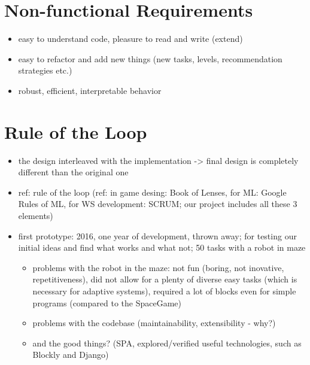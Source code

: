 \section{Non-functional Requirements}
\label{sec:robomission.nonfunctional-requirements}

\begin{itemize}
\item easy to understand code, pleasure to read and write (extend)
\item easy to refactor and add new things (new tasks, levels, recommendation strategies etc.)
\item robust, efficient, interpretable behavior
\end{itemize}



\section{Rule of the Loop}
\label{sec:robomission.rule-of-the-loop}

\begin{itemize}
\item the design interleaved with the implementation -> final design is completely different than the original one
\item ref: rule of the loop (ref: in game desing: Book of Lenses, for ML: Google Rules of ML, for WS development: SCRUM; our project includes all these 3 elements)
\item first prototype: 2016, one year of development, thrown away; for testing our initial ideas and find what works and what not; 50 tasks with a robot in maze
  \begin{itemize}
  \item problems with the robot in the maze: not fun (boring, not inovative, repetitiveness), did not allow for a plenty of diverse easy tasks (which is necessary for adaptive systems), required a lot of blocks even for simple programs (compared to the SpaceGame)
  \item problems with the codebase (maintainability, extensibility - why?)
  \item and the good things? (SPA, explored/verified useful technologies, such as Blockly and Django)
  \end{itemize}
\end{itemize}

